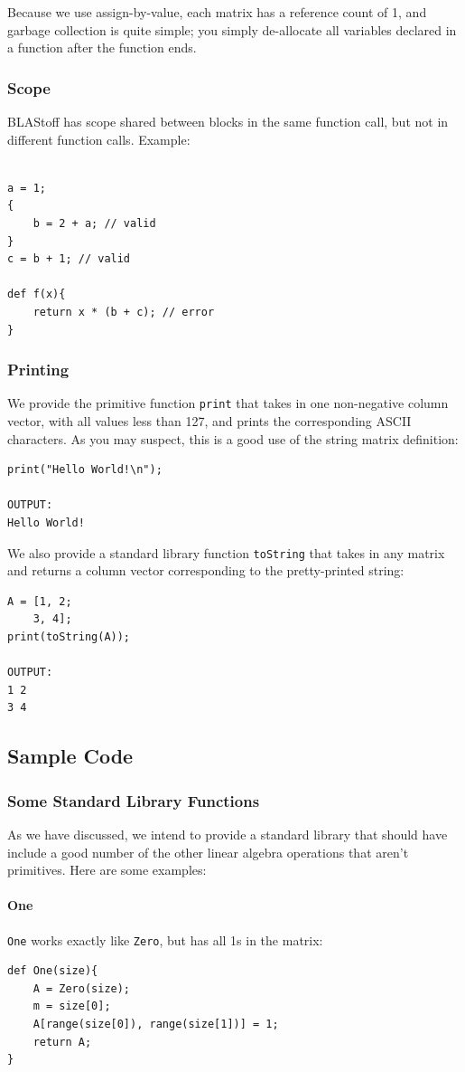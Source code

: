 Because we use assign-by-value, each matrix has a reference count of 1, and garbage collection is quite simple; you simply de-allocate all variables declared in a function after the function ends.

\subsubsection{Scope}
BLAStoff has scope shared between blocks in the same function call, but not in different function calls.   Example:
\begin{lstlisting}

a = 1;
{
    b = 2 + a; // valid
}
c = b + 1; // valid

def f(x){
    return x * (b + c); // error
}
\end{lstlisting}

\subsubsection{Printing}
We provide the primitive function \verb=print= that takes in one non-negative column vector, with all values less than 127, and prints the corresponding ASCII characters.  As you may suspect, this is a good use of the string matrix definition:
\begin{lstlisting}
print("Hello World!\n");

OUTPUT:
Hello World!
\end{lstlisting}
We also provide a standard library function \verb=toString= that takes in any matrix and returns a column vector corresponding to the pretty-printed string:
\begin{lstlisting}
A = [1, 2;
    3, 4];
print(toString(A));

OUTPUT:
1 2
3 4
\end{lstlisting}

\subsection{Sample Code}

\subsubsection{Some Standard Library Functions}
As we have discussed, we intend to provide a standard library that should have include a good number of the other linear algebra operations that aren't primitives.  Here are some examples:

\paragraph{One}
\verb=One= works exactly like \verb=Zero=, but has all 1s in the matrix:
\begin{lstlisting}
def One(size){
    A = Zero(size);
    m = size[0];
    A[range(size[0]), range(size[1])] = 1;
    return A;
}
\end{lstlisting}

